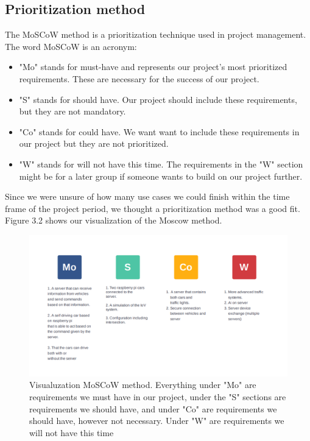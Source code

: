 \subsection{Prioritization method}
The MoSCoW method is a prioritization technique used in project management. The word MoSCoW is an acronym:

\begin{itemize}
	\item "Mo" stands for must-have and represents our project's most prioritized requirements. These are necessary for the success of our project.
	\item "S" stands for should have. Our project should include these requirements, but they are not mandatory.
	\item "Co" stands for could have. We want want to include these requirements in our project but they are not prioritized.
	\item "W" stands for will not have this time. The requirements in the "W" section might be for a later group if someone wants to build on our project further.
\end{itemize}

Since we were unsure of how many use cases we could finish within the time frame of the project period, we thought a prioritization method was a good fit. Figure 3.2 shows our visualization of the Moscow method.

\begin{figure}[h!]
	\centering
	\includegraphics[width=1\linewidth]{figures/MosCoW_method}
	\caption[MosCoW method]{Visualuzation MoSCoW method. Everything under "Mo" are requirements we must have in our project, under the "S" sections are requirements we should have, and under "Co" are requirements we should have, however not necessary. Under "W" are requirements we will not have this time}
	\label{fig:moscowmethod}
\end{figure}


